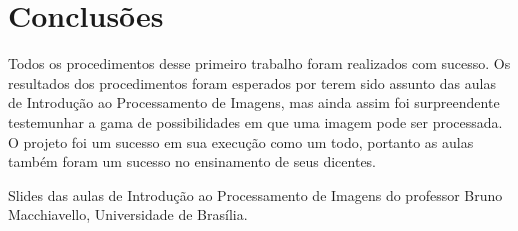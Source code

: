 \documentclass[conference]{IEEEtran}
\begin{document}

\section{Conclusões}

Todos os procedimentos desse primeiro trabalho foram realizados com sucesso. Os resultados dos procedimentos foram esperados por terem sido assunto das aulas de Introdução ao Processamento de Imagens, mas ainda assim foi surpreendente testemunhar a gama de possibilidades em que uma imagem pode ser processada. O projeto foi um sucesso em sua execução como um todo, portanto as aulas também foram um sucesso no ensinamento de seus dicentes.


\begin{thebibliography}{00}
     Slides das aulas de Introdução ao Processamento de Imagens do professor Bruno Macchiavello, Universidade de Brasília.
\end{thebibliography}
\end{document}

